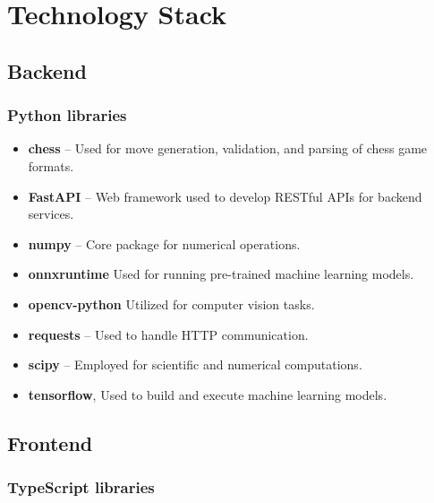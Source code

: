 \section{Technology Stack}
\label{sec:technology-stack}

\subsection*{Backend}
\subsubsection*{Python libraries}

\begin{itemize}
    \item \textbf{chess} – Used for move generation, validation, and parsing of chess game formats. \cite{python:chess}
    \item \textbf{FastAPI} – Web framework used to develop RESTful APIs for backend services. \cite{python:fastapi}
    \item \textbf{numpy} – Core package for numerical operations. \cite{python:numpy}
    \item \textbf{onnxruntime} Used for running pre-trained machine learning models. \cite{python:onnx}
    \item \textbf{opencv-python} Utilized for computer vision tasks. \cite{python:opencv}
    \item \textbf{requests} – Used to handle HTTP communication. \cite{python:requests}
    \item \textbf{scipy} – Employed for scientific and numerical computations. \cite{python:scipy}
    \item \textbf{tensorflow}, Used to build and execute machine learning models. \cite{python:tensorflow}
\end{itemize}


\subsection*{Frontend}
\subsubsection*{TypeScript libraries}

